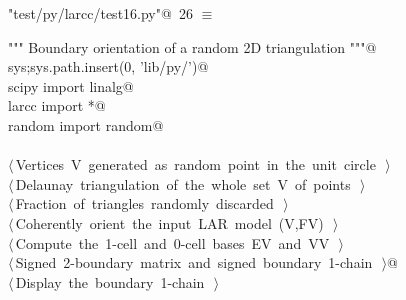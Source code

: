 \documentclass[11pt,oneside]{article}	%
\begin{document}
\begin{flushleft} \small \label{scrap45}
\protect{}\verb@"test/py/larcc/test16.py"@\nobreak\ {\footnotesize 26 }$\equiv$
\vspace{-1ex}
\begin{list}{}{} \item
\mbox{}\verb@""" Boundary orientation of a random 2D triangulation """@\\
\mbox{}\verb@import sys;sys.path.insert(0, 'lib/py/')@\\
\mbox{}\verb@from scipy import linalg@\\
\mbox{}\verb@from larcc import *@\\
\mbox{}\verb@from random import random@\\
\mbox{}\verb@@\\
\mbox{}\verb@@\hbox{$\langle\,$Vertices V generated as random point in the unit circle\nobreak\ {\footnotesize {}}$\,\rangle$}\verb@@\\
\mbox{}\verb@@\hbox{$\langle\,$Delaunay triangulation of the whole set V of points\nobreak\ {\footnotesize {}}$\,\rangle$}\verb@@\\
\mbox{}\verb@@\hbox{$\langle\,$Fraction of triangles randomly discarded\nobreak\ {\footnotesize {}}$\,\rangle$}\verb@@\\
\mbox{}\verb@@\hbox{$\langle\,$Coherently orient the input LAR model (V,FV)\nobreak\ {\footnotesize {}}$\,\rangle$}\verb@@\\
\mbox{}\verb@@\hbox{$\langle\,$Compute the 1-cell and 0-cell bases EV and VV\nobreak\ {\footnotesize {}}$\,\rangle$}\verb@@\\
\mbox{}\verb@@\hbox{$\langle\,$Signed 2-boundary matrix and signed boundary 1-chain\nobreak\ {\footnotesize {}}$\,\rangle$}\verb@   @\\
\mbox{}\verb@@\hbox{$\langle\,$Display the boundary 1-chain\nobreak\ {\footnotesize {}}$\,\rangle$}\verb@@\\
\mbox{}\verb@@{\NWsep}
\end{list}
\vspace{-2ex}
\end{flushleft}
\end{document}
